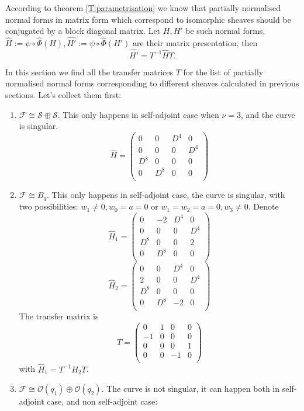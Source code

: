 \documentclass[11pt]{article}
\theoremstyle{definition}
\theoremstyle{plain}
\numberwithin{equation}{section}
\begin{document}
According to theorem \ref{T:parametrisation} we know that  partially normalised normal forms in matrix form which correspond to isomorphic sheaves  should be conjugated by a block diagonal matrix. Let $H, H'$ be such normal forms,  $\hat{H}:=\psi\circ\hat{\Phi}(H),\hat{H'}:=\psi\circ\hat{\Phi}(H')$ are their matrix presentation, then 
$$
\hat{H'}=T^{-1}\hat{H}T.
$$

In this section we find all the transfer matrices $T$ for the list of partially normalised normal forms corresponding to different sheaves calculated in previous sections.  Let's collect them first:
\begin{enumerate}
	\item $\mathcal{F}\cong \mathcal{S}\oplus \mathcal{S}$. This only happens in self-adjoint case when $\nu = 3$, and the curve is singular.
	$$\hat{H}=\left(
	\begin{array}{cccc}
		0 & 0 & D^4 & 0 \\
		0 & 0 & 0 & D^4 \\
		D^8 & 0 & 0 & 0 \\
		0 & D^8 & 0 & 0 \\
	\end{array}
	\right)$$
	\item $\mathcal{F}\cong B_q$. This only happens in self-adjoint case, the curve is singular, with two possibilities: $w_1\neq 0,w_0=a=0$ or $w_1=w_2=a=0,w_3\neq 0$. Denote 
	$$
	\hat{H}_1=\left(
	\begin{array}{cccc}
		0 & -2 & D^4 & 0 \\
		0 & 0 & 0 & D^4 \\
		D^8 & 0 & 0 & 2 \\
		0 & D^8 & 0 & 0 \\
	\end{array}
	\right)
	$$
	$$
	\hat{H}_2=\left(
	\begin{array}{cccc}
		0 & 0 & D^4 & 0 \\
		2 & 0 & 0 & D^4 \\
		D^8 & 0 & 0 & 0 \\
		0 & D^8 & -2 & 0 \\
	\end{array}
	\right)
	$$
	The transfer matrix is 
	$$
	T=\left(
	\begin{array}{cccc}
		0 & 1 & 0 & 0 \\
		-1 & 0 & 0 & 0 \\
		0 & 0 & 0 & 1 \\
		0 & 0 & -1 & 0 \\
	\end{array}
	\right)
	$$
	with $\hat{H}_1=T^{-1}\hat{H}_2T$.
	\item $\mathcal{F}\cong \mathcal{O}(q_1)\oplus \mathcal{O}(q_2)$. The curve is not singular, it can happen both in self-adjoint case, and non self-adjoint case:
	

\end{enumerate}
\end{document}
